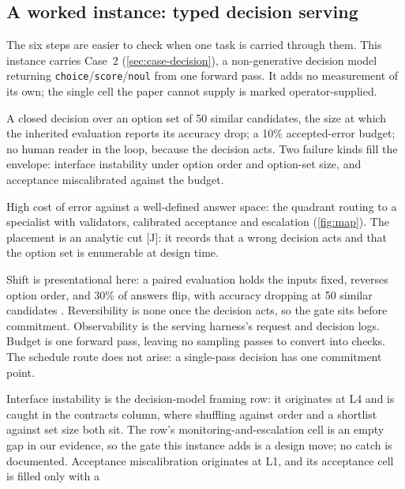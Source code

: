 \subsection{A worked instance: typed decision serving}
\label{sec:sel-instance}
The six steps are easier to check when one task is carried through them. This instance carries
Case~2 (\cref{sec:case-decision}), a non-generative decision model returning
\texttt{choice}/\texttt{score}/\texttt{noul} from one forward pass. It adds no measurement of its
own; the single cell the paper cannot supply is marked operator-supplied.

\begin{description}[leftmargin=1.5em, itemsep=2pt]
\item[\textbf{1. Risk specification.}] A closed decision over an option set of 50 similar
  candidates, the size at which the inherited evaluation reports its accuracy drop; a 10\%
  accepted-error budget; no human reader in the loop, because the decision acts. Two failure kinds
  fill the envelope: interface instability under option order and option-set size, and acceptance
  miscalibrated against the budget.
\item[\textbf{2. Placement.}] High cost of error against a well-defined answer space: the quadrant
  routing to a specialist with validators, calibrated acceptance and escalation (\cref{fig:map}).
  The placement is an analytic cut \textsf{[J]}: it records that a wrong decision acts and that
  the option set is enumerable at design time.
\item[\textbf{3. Modifier routes.}] Shift is presentational here: a paired evaluation holds the
  inputs fixed, reverses option order, and 30\% of answers flip, with accuracy dropping at 50
  similar candidates . Reversibility is none once the decision acts, so
  the gate sits before commitment. Observability is the serving harness's request and decision
  logs. Budget is one forward pass, leaving no sampling passes to convert into checks. The schedule
  route does not arise: a single-pass decision has one commitment point.
\item[\textbf{4. Probe against the failure matrix.}] Interface instability is the decision-model
  framing row: it originates at L4 and is caught in the contracts column, where shuffling against
  order and a shortlist against set size both sit. The row's monitoring-and-escalation cell is an
  empty gap in our evidence, so the gate this instance adds is a design move; no catch is
  documented. Acceptance
  miscalibration originates at L1, and its acceptance cell is filled only with a

\end{description}
